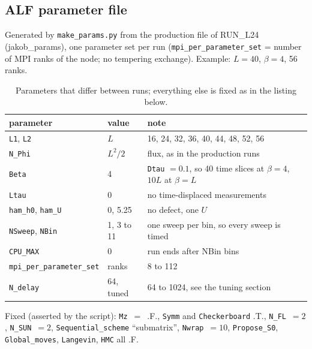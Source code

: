 \documentclass[11pt,a4paper]{article}
\begin{document}
\subsection*{ALF parameter file}
Generated by \texttt{make\_params.py} from the production file of RUN\_L24 (jakob\_params), one parameter set per run
(\texttt{mpi\_per\_parameter\_set} = number of MPI ranks of the node; no tempering exchange). Example: $L=40$, $\beta=4$, 56 ranks.
\begin{table}[H]\centering\small
\caption{Parameters that differ between runs; everything else is fixed as in the listing below.}
\begin{tabular}{@{}lll@{}}\toprule
parameter & value & note\\\midrule
\texttt{L1}, \texttt{L2} & $L$ & 16, 24, 32, 36, 40, 44, 48, 52, 56\\
\texttt{N\_Phi} & $L^2/2$ & flux, as in the production runs\\
\texttt{Beta} & 4 & \texttt{Dtau} $=0.1$, so 40 time slices at $\beta=4$, $10L$ at $\beta=L$\\
\texttt{Ltau} & 0 & no time-displaced measurements\\
\texttt{ham\_h0}, \texttt{ham\_U} & 0, 5.25 & no defect, one $U$\\
\texttt{NSweep}, \texttt{NBin} & 1, 3 to 11 & one sweep per bin, so every sweep is timed\\
\texttt{CPU\_MAX} & 0 & run ends after NBin bins\\
\texttt{mpi\_per\_parameter\_set} & ranks & 8 to 112\\
\texttt{N\_delay} & 64, tuned & 64 to 1024, see the tuning section\\\bottomrule
\end{tabular}\end{table}
Fixed (asserted by the script): \texttt{Mz}~$=$~.F., \texttt{Symm} and \texttt{Checkerboard} .T., \texttt{N\_FL}~$=2$, \texttt{N\_SUN}~$=2$,
\texttt{Sequential\_scheme} ``submatrix'', \texttt{Nwrap}~$=10$, \texttt{Propose\_S0}, \texttt{Global\_moves}, \texttt{Langevin}, \texttt{HMC} all .F.
\small\normalsize
\end{document}
